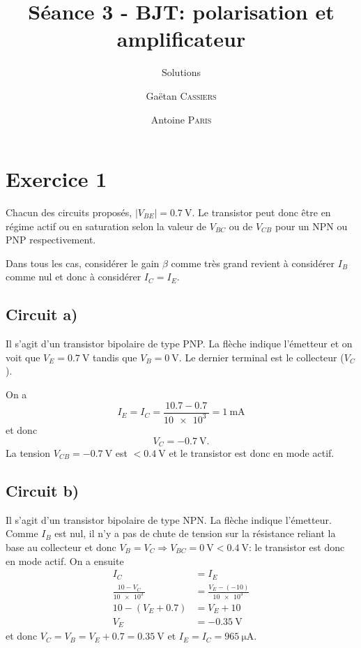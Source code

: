 \documentclass[frenchb,DIV=13]{scrartcl}
\title{Séance 3 - BJT: polarisation et amplificateur}
\subtitle{Solutions}
\author{\small Gaëtan \textsc{Cassiers} \and\small Antoine \textsc{Paris}}
\date{}
\begin{document}
\maketitle

\section*{Exercice 1}
Chacun des circuits proposés, $|V_{BE}| = \SI{0.7}{\volt}$. Le transistor peut
donc être en régime actif ou en saturation selon la valeur de $V_{BC}$ ou de
$V_{CB}$ pour un NPN ou PNP respectivement.

Dans tous les cas, considérer le gain $\beta$ comme très grand revient à considérer
$I_B$ comme nul et donc à considérer $I_C = I_E$.

\subsection*{Circuit a)} 
Il s'agit d'un transistor bipolaire de type PNP. La flèche indique l'émetteur et
on voit que $V_E = \SI{0.7}{\volt}$ tandis que $V_B = \SI{0}{\volt}$.
Le dernier terminal est le collecteur ($V_C$).

On a
\[ I_E = I_C = \frac{10.7-0.7}{\SI{10e3}{}} = \SI{1}{\milli\ampere} \]
et donc
\[ V_C = \SI{-0.7}{\volt}. \]
La tension $V_{CB} = \SI{-0.7}{\volt}$ est $< \SI{0.4}{\volt}$ et le transistor
est donc en mode actif.

\subsection*{Circuit b)}
Il s'agit d'un transistor bipolaire de type NPN. La flèche indique l'émetteur.
Comme $I_B$ est nul, il n'y a pas de chute de tension sur la résistance reliant
la base au collecteur et donc $V_B = V_C \Rightarrow V_{BC} = \SI{0}{\volt} < \SI{0.4}{\volt}$:
le transistor est donc en mode actif. On a ensuite
\begin{align*}
	I_C &= I_E \\
	\frac{10-V_C}{\SI{10e3}{}} &= \frac{V_E - (-10)}{\SI{10e3}{}} \\
	10 - (V_E + 0.7) &= V_E + 10 \\
	V_E &= -\SI{0.35}{\volt}
\end{align*}
et donc $V_C = V_B = V_E+0.7 = \SI{0.35}{\volt}$ et $I_E = I_C = \SI{965}{\micro\ampere}$.
\end{document}
